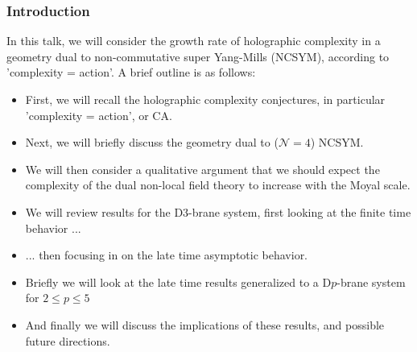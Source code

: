 \documentclass[8pt,aspectratio=169]{beamer}
\begin{document}
\begin{frame}
\frametitle{Introduction}

In this talk, we will consider the growth rate of holographic complexity in a geometry dual to non-commutative super Yang-Mills (NCSYM), according to 'complexity = action'. A brief outline is as follows:

\begin{itemize}

\item First, we will recall the holographic complexity conjectures, in particular 'complexity = action', or CA.

\item Next, we will briefly discuss the geometry dual to ($\mathcal{N} = 4$) NCSYM.

\item We will then consider a qualitative argument that we should expect the complexity of the dual non-local field theory to increase with the Moyal scale.

\item We will review results for the D3-brane system, first looking at the finite time behavior ...

\item ... then focusing in on the late time asymptotic behavior. 

\item Briefly we will look at the late time results generalized to a D$p$-brane system for $2\leq p \leq 5$

\item And finally we will discuss the implications of these results, and possible future directions.

\end{itemize}

\end{frame}
\end{document}
